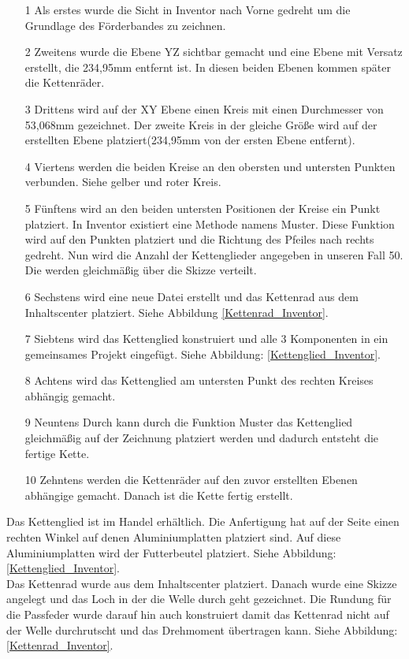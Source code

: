 \begin{itemize}
\item[1] Als erstes wurde die Sicht in Inventor nach Vorne gedreht um die Grundlage des Förderbandes zu zeichnen.
\item[2] Zweitens wurde die Ebene YZ sichtbar gemacht und eine Ebene mit Versatz erstellt, die 234,95mm entfernt ist. In diesen beiden Ebenen kommen später die Kettenräder.
\item[3] Drittens wird auf der XY Ebene einen Kreis mit einen Durchmesser von 53,068mm gezeichnet. Der zweite Kreis in der gleiche Größe wird auf der erstellten Ebene platziert(234,95mm von der ersten Ebene entfernt). 
\item[4] Viertens werden die beiden Kreise an den obersten und untersten Punkten verbunden. Siehe gelber und roter Kreis.
\item[5] Fünftens wird an den beiden untersten Positionen der Kreise ein Punkt platziert. In Inventor existiert eine Methode namens Muster. Diese Funktion wird auf den Punkten platziert und die Richtung des Pfeiles nach rechts gedreht. Nun wird die Anzahl der Kettenglieder angegeben in unseren Fall 50. Die werden gleichmäßig über die Skizze verteilt.
\item[6] Sechstens wird eine neue Datei erstellt und das Kettenrad aus dem Inhaltscenter platziert. Siehe Abbildung \ref{Kettenrad_Inventor}.
\item[7] Siebtens wird das Kettenglied konstruiert und alle 3 Komponenten in ein gemeinsames Projekt eingefügt. Siehe Abbildung: \ref{Kettenglied_Inventor}.
\item[8] Achtens wird das Kettenglied am untersten Punkt des rechten Kreises abhängig gemacht.
\item[9] Neuntens Durch kann durch die Funktion Muster das Kettenglied gleichmäßig auf der Zeichnung platziert werden und dadurch entsteht die fertige Kette.
\item[10] Zehntens werden die Kettenräder auf den zuvor erstellten Ebenen abhängige gemacht. Danach ist die Kette fertig erstellt.\\
\end{itemize}

Das Kettenglied ist im Handel erhältlich. Die Anfertigung hat auf der Seite einen rechten Winkel auf denen Aluminiumplatten platziert sind. Auf diese Aluminiumplatten wird der Futterbeutel platziert. Siehe Abbildung: \ref{Kettenglied_Inventor}.\\

Das Kettenrad wurde aus dem Inhaltscenter platziert. Danach wurde eine Skizze angelegt und das Loch in der die Welle durch geht gezeichnet. Die Rundung für die Passfeder wurde darauf hin auch konstruiert damit das Kettenrad nicht auf der Welle durchrutscht und das Drehmoment übertragen kann. Siehe Abbildung: \ref{Kettenrad_Inventor}.

